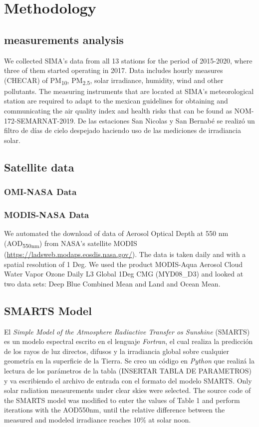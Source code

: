 \section{Methodology}
\subsection{measurements analysis}
We collected SIMA’s data from all 13 stations for the period of 2015-2020, where three of them
started operating in 2017. Data includes hourly measures (CHECAR) of PM\textsubscript{10}, PM\textsubscript{2.5},
solar irradiance, humidity, wind and other pollutants. The measuring instruments that are located at SIMA’s
meteorological station are required to adapt to the mexican guidelines for obtaining and communicating the
air quality index and health risks that can be found as NOM-172-SEMARNAT-2019. De las estaciones San Nicolas
y San Bernabé se realizó un filtro de días de cielo despejado haciendo uso de las mediciones de irradiancia solar.

\subsection{Satellite data}
\subsubsection{OMI-NASA Data}
\subsubsection{MODIS-NASA Data}
We automated the download of data of Aerosol Optical Depth at 550 nm (AOD\textsubscript{550nm}) from NASA’s
satellite MODIS (\url{https://ladsweb.modaps.eosdis.nasa.gov/}). The data is taken daily and with a spatial
resolution of 1 Deg. We used the product MODIS-Aqua Aerosol Cloud Water Vapor Ozone Daily L3 Global 1Deg CMG
(MYD08\_D3) and looked at two data sets: Deep Blue Combined Mean and Land and Ocean Mean. 
\subsection{SMARTS Model}
El \textit{Simple Model of the Atmosphere Radiactive Transfer os Sunshine} (SMARTS) es un modelo espectral
escrito en el lenguaje \textit{Fortran}, el cual realiza la predicción de los rayos de luz directos, difusos y la 
irradiancia global sobre cualquier geometría en la superficie de la Tierra. Se creo un código en \textit{Python} que 
realizá la lectura de los parámetros de la tabla (INSERTAR TABLA DE PARAMETROS) y va escribiendo el archivo de entrada 
con el formato del modelo SMARTS. 
Only solar radiation measurements under clear skies were selected. The source code of the SMARTS model was
modified to enter the values of Table 1 and perform iterations with the AOD550nm, until the relative difference
between the measured and modeled irradiance reaches 10\% at solar noon.

